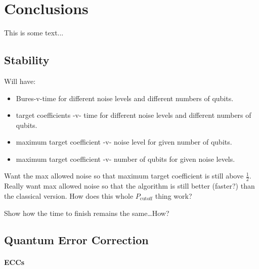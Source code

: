 
\chapter{Conclusions}
\label{chap:conclusion}
%

This is some text...

\section{Stability}

Will have:
\begin{itemize}
\item Bures-v-time for different noise levels and different numbers of qubits.
\item target coefficients -v- time for different noise levels and different numbers
of qubits.
\item maximum target coefficient -v- noise level for given number of qubits.
\item maximum target coefficient -v- number of qubits for given noise levels.
\end{itemize}
Want the max allowed noise so that maximum target coefficient is still above 
$\frac{1}{2}$.  Really want max allowed noise so that the algorithm is still
better (faster?) than the classical version.  How does this whole
$P_{\text{cutoff}}$ thing work?\cite{Pablo-Norman/Ruiz-Altaba:99}

Show how the time to finish remains the same\dots How?


\section{Quantum Error Correction}

\subsubsection{ECCs}
